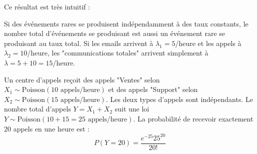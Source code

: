 Ce résultat est très intuitif :

\begin{intuitionbox}
Si des événements rares se produisent indépendamment à des taux constants, le nombre total d'événements se produisant est aussi un événement rare se produisant au taux total. Si les emails arrivent à $\lambda_1=5$/heure et les appels à $\lambda_2=10$/heure, les "communications totales" arrivent simplement à $\lambda = 5+10 = 15$/heure.
\end{intuitionbox}

\begin{examplebox}
Un centre d'appels reçoit des appels "Ventes" selon $X_1 \sim \text{Poisson}(10 \text{ appels/heure})$ et des appels "Support" selon $X_2 \sim \text{Poisson}(15 \text{ appels/heure})$. Les deux types d'appels sont indépendants.
Le nombre total d'appels $Y = X_1 + X_2$ suit une loi $Y \sim \text{Poisson}(10+15=25 \text{ appels/heure})$.
La probabilité de recevoir exactement 20 appels en une heure est :
$$P(Y=20) = \frac{e^{-25} 25^{20}}{20!}$$
\end{examplebox}